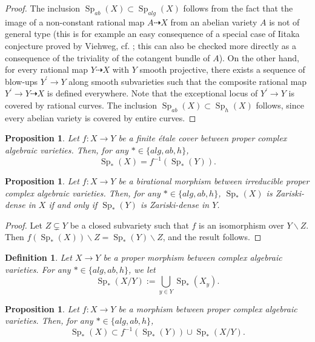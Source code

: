 \documentclass[11pt,letterpaper]{amsart}
\theoremstyle{plain}
\newtheorem{prop}[thm]{Proposition}
\newtheorem{defn}[thm]{Definition}
\DeclareMathOperator{\Sp}{Sp}
\begin{document}
\begin{proof}
The inclusion $\Sp_{ab}(X) \subset \Sp_{alg}(X)$ follows from the fact that the image of a non-constant rational map $A \dasharrow X$ from an abelian variety $A$ is not of general type (this is for example an easy consequence of a special case of Iitaka conjecture proved by Viehweg, cf. \cite[Corollary IV]{Viehweg83}; this can also be checked more directly as a consequence of the triviality of the cotangent bundle of $A$).
On the other hand, for every rational map $Y \dasharrow X$ with $Y$ smooth projective, there exists a sequence of blow-ups $Y^\prime \to Y$ along smooth subvarieties such that the composite rational map $Y^\prime \to Y \dasharrow X$ is defined everywhere. Note that the exceptional locus of $Y^\prime \to Y$ is covered by rational curves. The inclusion $\Sp_{ab}(X) \subset \Sp_h(X)$ follows, since every abelian variety is covered by entire curves.
\end{proof}



\begin{prop}\label{Special sets and finite étale cover}
Let $f \colon X \to Y$ be a finite étale cover between proper complex algebraic varieties. Then, for any $\ast \in \{ alg, ab, h \}$,
\[ \Sp_\ast(X) = f^{-1}\left( \Sp_\ast(Y) \right) . \]
\end{prop}


\begin{prop}\label{Special sets and birational morphism}
Let $f \colon X \to Y$ be a birational morphism between irreducible proper complex algebraic varieties. Then, for any $\ast \in \{ alg, ab, h \}$, $\Sp_\ast(X)$ is Zariski-dense in $X$ if and only if $\Sp_\ast(Y)$ is Zariski-dense in $Y$.
\end{prop}
\begin{proof}
Let $Z \subsetneq Y$ be a closed subvariety such that $f$ is an isomorphism over $Y \backslash Z$. Then $ f \left( \Sp_\ast(X) \right) \backslash Z = \Sp_\ast(Y)  \backslash Z $, and the result follows.
\end{proof}

\begin{defn} 
Let $X \to Y$ be a proper morphism between complex algebraic varieties. For any $\ast \in \{ alg, ab, h \}$, we let
\[ \Sp_\ast(X/Y) := \bigcup_{y \in Y} \Sp_\ast(X_y) . \]
\end{defn}


\begin{prop}\label{Special sets and fibrations}
Let $f \colon X \to Y$ be a morphism between proper complex algebraic varieties. Then, for any $\ast \in \{ alg, ab, h \}$,
\[ \Sp_\ast(X) \subset f^{-1} \left( \Sp_\ast(Y) \right)  \cup \Sp_\ast(X/Y) . \]
\end{prop}
\end{document}
